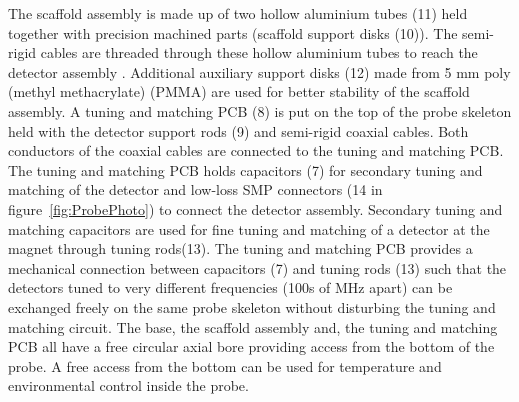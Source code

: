 \documentclass[preprint,12pt]{article}
\begin{document}
The scaffold assembly is made up of two hollow aluminium tubes (11) held together with precision machined parts (scaffold support disks (10)). The semi-rigid cables are threaded through these hollow aluminium tubes to reach the detector assembly . Additional auxiliary support disks (12) made from 5 mm poly (methyl methacrylate) (PMMA) are used for better stability of the scaffold assembly. A tuning and matching PCB (8) is put on the top of the probe skeleton held with the detector support rods (9) and semi-rigid coaxial cables. Both conductors of the coaxial cables are connected to the tuning and matching PCB. The tuning and matching PCB holds capacitors (7) for secondary tuning and matching of the detector and low-loss SMP connectors (14 in figure~\ref{fig:ProbePhoto}) to connect the detector assembly. Secondary tuning and matching capacitors are used for fine tuning and matching of a detector at the magnet through tuning rods(13). The tuning and matching PCB provides a mechanical connection between capacitors (7) and tuning rods (13) such that the detectors tuned to very different frequencies (100s of MHz apart) can be exchanged freely on the same probe skeleton without disturbing the tuning and matching circuit. The base, the scaffold assembly and, the tuning and matching PCB all have a free circular axial bore providing access from the bottom of the probe. A free access from the bottom can be used for temperature and environmental control inside the probe.\par
\end{document}
